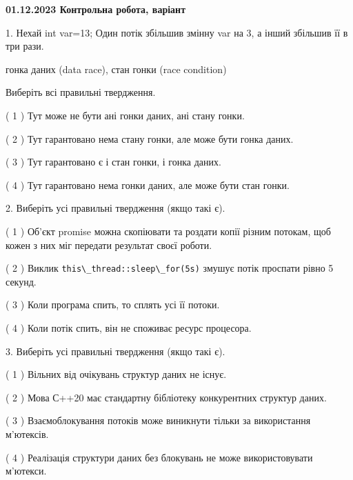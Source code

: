 \documentclass[12pt, ukrainian]{article}
\def\code#1{\Verb!#1!}
\begin{document}
\vspace{4mm}
\newpage
\begin {large}

\textbf{01.12.2023 Контрольна робота, варіант  }\par


{
1. Нехай int var=13; Один потік збільшив змінну var на 3, а інший збільшив її в три рази.

гонка даних (data race), стан гонки (race condition)

Виберіть всі правильні твердження.\par
\vspace{2mm}
( 1 ) Тут може не бути ані гонки даних, ані стану гонки.%

( 2 ) Тут гарантовано нема стану гонки, але може бути гонка даних.%

( 3 ) Тут гарантовано є і стан гонки, і гонка даних.%

( 4 ) Тут гарантовано нема гонки даних, але може бути стан гонки.%


\vspace{5mm}
2. Виберіть усі правильні твердження (якщо такі є).\par
\vspace{2mm}

( 1 ) Об’єкт promise можна скопіювати та роздати копії різним потокам, щоб кожен з них міг передати результат своєї роботи.%

( 2 ) Виклик \code{this\_thread::sleep\_for(5s)} змушує потік проспати рівно 5 секунд.%

( 3 ) Коли програма спить, то сплять усі її потоки.%

( 4 ) Коли потік спить, він не споживає ресурс процесора.%


\vspace{5mm}
3. Виберіть усі правильні твердження (якщо такі є).\par
\vspace{2mm}

( 1 ) Вільних від очікувань структур даних не існує.%

( 2 ) Мова С++20 має стандартну бібліотеку конкурентних структур даних.%

( 3 ) Взаємоблокування потоків може виникнути тільки за використання м’ютексів.%

( 4 ) Реалізація структури даних без блокувань не може використовувати м’ютекси.%


}
\end{large}
\end{document}

